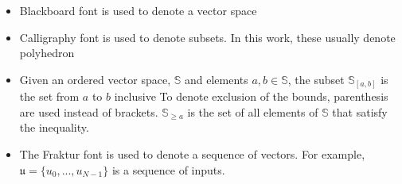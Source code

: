 \begin{itemize}
    \item Blackboard font is used to denote a vector space
    \item Calligraphy font is used to denote subsets. In this work, these usually denote polyhedron
    \item Given an ordered vector space, $\mathbb{S}$ and elements $a,b\in\mathbb{S}$, the subset $\mathbb{S}_{[a,b]}$ is the set from $a$ to $b$ inclusive To denote exclusion of the bounds, parenthesis are used instead of brackets. $\mathbb{S}_{\geq a}$ is the set of all elements of $\mathbb{S}$ that satisfy the inequality.
    \item The Fraktur font is used to denote a sequence of vectors. For example, $\mathfrak{u}=\{u_0,...,u_{N-1}\}$ is a sequence of inputs.
\end{itemize}